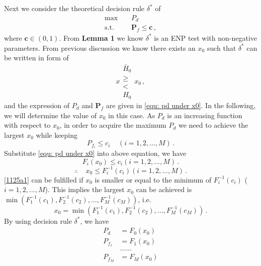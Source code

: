 Next we consider the theoretical decision rule $\delta^\ast$ of
\begin{equation}
\begin{split}
\max\;\;\;\; &P_d\\
\text{s.t.}\;\;\;\;&\mathbf{P}_f \leq \mathbf{c}\,,
\end{split}
\end{equation}
where $\mathbf{c} \in (0, 1)$.
From \textbf{Lemma 1} we know $\delta^\ast$ is an ENP test with non-negative parameters. From previous discussion we know there exists an $x_0$ such that $\delta^\ast$ can be written in form of 
\begin{equation}
\label{1124a1}
x\substack{\bar{H}_0 \\\geq\\< \\H_0}x_0\,,
\end{equation}
and the expression of $P_d$ and $\mathbf{P}_f$ are given in \eqref{equ: pd under x0}. 
In the following, we will determine the value of $x_0$ in this case. 
As $P_d$ is an increasing function with respect to $x_0$, in order to acquire the maximum $P_d$ we need to achieve the largest $x_0$ while keeping 
\begin{equation}
P_{f_i} \leq c_i\;\;\;\;(i = 1, 2, ..., M)\,.
\end{equation}
Substitute \eqref{equ: pd under x0} into above equation, we have
\begin{equation}
F_i(x_0) \leq c_i (i=1, 2, ..., M)\,.
\end{equation}
\begin{equation}
\label{1125a1}
\therefore\;\;\;\; x_0 \leq F^{-1}_{i}(c_i) (i=1, 2, ..., M)\,.
\end{equation}
\eqref{1125a1} can be fulfilled if $x_0$ is 
 smaller or equal to the minimum of $F^{-1}_{i}(c_i)$ ($i=1, 2, ..., M$). This implies the largest $x_0$ can be achieved is $\min(F_1^{-1}(c_1), F_2^{-1}(c_2), ..., F_M^{-1}(c_M))$, i.e.
\begin{equation}
x_0 = \min(F_1^{-1}(c_1), F_2^{-1}(c_2), ..., F_M^{-1}(c_M))\,.
\end{equation}
By using decision rule $\delta^\ast$, we have
\begin{equation}
\begin{split}
\label{equ: pd under x00}
P_d &=  F_0(x_0)\\
P_{f_1} &=  F_1(x_0)\\
  &......\\
P_{f_M} &= F_M(x_0)
\end{split}
\end{equation}
\typeout{}


\typeout{}

